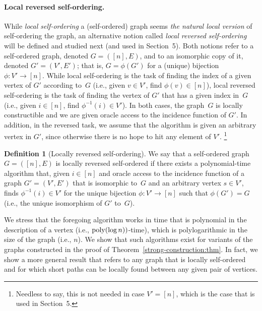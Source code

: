 \documentclass[10pt,a4paper]{article}
\theoremstyle{definition}
\newtheorem{definition}[theorem]{Definition}
\newcommand{\BD}{\begin{definition}}   \newcommand{\ED}{\end{definition}}
\newcommand{\poly}{{\rm poly}}
\begin{document}
\paragraph{Local reversed self-ordering.}
While {\em local self-ordering}\/ a (self-ordered) graph
seems {\em the natural local version}\/ of self-ordering the graph,
an alternative notion called {\em local reversed self-ordering}\/
will be defined and studied next
(and used in Section~5).
Both notions refer to a self-ordered graph, denoted $G=([n],E)$,
and to an isomorphic copy of it, denoted $G'=(V',E')$;
that is, $G=\phi(G')$ for a (unique) bijection  $\phi:V'\to[n]$.
While local self-ordering is the task of
finding the index of a given vertex of $G'$ according to~$G$
(i.e., given $v\in V'$, find $\phi(v)\in[n]$),
local reversed self-ordering is the task of
finding the vertex of $G'$ that has a given index in~$G$
(i.e., given $i\in[n]$, find $\phi^{-1}(i)\in V'$).
%
%
%
%
%
%
In both cases, the graph~$G$ is locally constructible
and we are given oracle access to the incidence function of $G'$.
In addition, in the reversed task, we assume that the algorithm
is given an arbitrary vertex in $G'$,
since otherwise there is no hope to hit any element of $V'$.
\footnote{Needless to say, this is not needed in case $V'=[n]$,
which is the case that is used in Section~5.}

%
\BD[Locally reversed self-ordering]
\label{local-reversed-so:def}
We say that a self-ordered graph $G=([n],E)$
is {\sf locally reversed self-ordered}
if there exists a polynomial-time algorithm that,
given $i\in[n]$
and oracle access to the incidence function of
a graph $G'=(V',E')$ that is isomorphic to~$G$
and an arbitrary vertex $s\in V'$,
finds $\phi^{-1}(i)\in V'$ for the unique bijection  $\phi:V'\to[n]$
such that $\phi(G')=G$
{\rm(i.e., the unique isomorphism of $G'$ to~$G$)}.
\ED
We stress that the foregoing algorithm works in time that is polynomial
in the description of a vertex (i.e., $\poly(\log n))$-time),
which is polylogarithmic in the size of the graph (i.e., $n$).
We show that such algorithms exist for variants of the graphs
constructed in the proof of Theorem~\ref{strong-construction:thm}.
In fact, we show a more general result that refers
to any graph that is locally self-ordered and for which
short paths can be locally found between any given pair of vertices.
\end{document}
